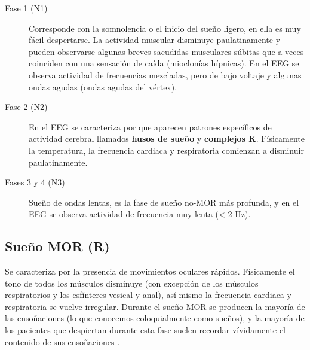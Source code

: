 \begin{description}
\item[Fase 1 (N1)] Corresponde con la somnolencia o el inicio del sue\~no ligero, en ella es muy 
f\'acil despertarse. La actividad muscular disminuye paulatinamente y pueden observarse algunas 
breves sacudidas musculares s\'ubitas que a veces coinciden con una sensación de ca\'ida 
(mioclon\'ias h\'ipnicas). En el EEG se observa actividad de frecuencias mezcladas, pero de bajo 
voltaje y algunas ondas agudas (ondas agudas del v\'ertex). 

\item[Fase 2 (N2)] En el EEG se caracteriza por que aparecen patrones espec\'ificos de actividad 
cerebral llamados \textbf{husos de sue\~no} y \textbf{complejos K}. F\'isicamente la 
temperatura, la frecuencia cardiaca y respiratoria comienzan a disminuir paulatinamente. 

\item[Fases 3 y 4 (N3)] Sue\~no de ondas lentas, es la fase de sue\~no no-MOR m\'as profunda, 
y en el EEG se observa actividad de frecuencia muy lenta (< 2 Hz).
\end{description}


\subsection{Sueño MOR (R)}

Se caracteriza por la presencia de movimientos oculares r\'apidos. F\'isicamente el tono de todos 
los m\'usculos disminuye (con excepción de los m\'usculos respiratorios y los esf\'interes vesical 
y anal), as\'i mismo la frecuencia cardiaca y respiratoria se vuelve irregular.%
Durante el sue\~no MOR se producen la mayor\'ia de las enso\~naciones (lo que conocemos 
coloquialmente como sue\~nos), y la mayor\'ia de los pacientes que despiertan durante esta fase 
suelen recordar v\'ividamente el contenido de sus enso\~naciones \cite{Chokroverty09}.


